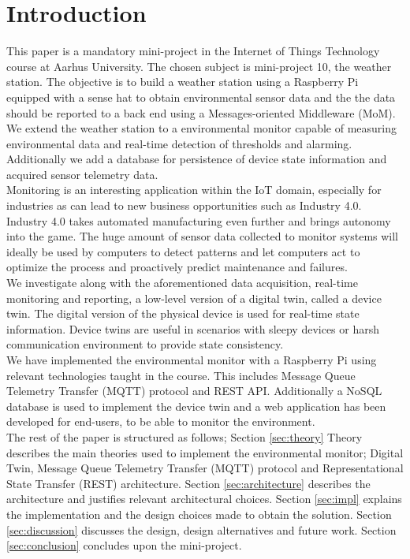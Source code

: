 \section{Introduction}
This paper is a mandatory mini-project in the Internet of Things Technology course at Aarhus University. The chosen subject is mini-project 10, the weather station. The objective is to build a weather station using a Raspberry Pi equipped with a sense hat to obtain environmental sensor data and the the data should be reported to a back end using a Messages-oriented Middleware (MoM). We extend the weather station to a environmental monitor capable of measuring environmental data and real-time detection of thresholds and alarming. Additionally we add a database for persistence of device state information and acquired sensor telemetry data. \\

Monitoring is an interesting application within the IoT domain, especially for industries as can lead to new business opportunities such as Industry 4.0. Industry 4.0 takes automated manufacturing even further and brings autonomy into the game. The huge amount of sensor data collected to monitor systems will ideally be used by computers to detect patterns and let computers act to optimize the process and proactively predict maintenance and failures. \\

We investigate along with the aforementioned data acquisition, real-time monitoring and reporting, a low-level version of a digital twin, called a device twin. The digital version of the physical device is used for real-time state information. Device twins are useful in scenarios with sleepy devices or harsh communication environment to provide state consistency. \\

We have implemented the environmental monitor with a Raspberry Pi using relevant technologies taught in the course. This includes Message Queue Telemetry Transfer (MQTT) protocol and REST API. Additionally a NoSQL database is used to implement the device twin and a web application has been developed for end-users, to be able to monitor the environment. \\

The rest of the paper is structured as follows; Section \ref{sec:theory} Theory describes the main theories used to implement the environmental monitor; Digital Twin, Message Queue Telemetry Transfer (MQTT) protocol and Representational State Transfer (REST) architecture. Section \ref{sec:architecture} describes the architecture and justifies relevant architectural choices. Section \ref{sec:impl} explains the implementation and the design choices made to obtain the solution. Section \ref{sec:discussion} discusses the design, design alternatives and future work. Section \ref{sec:conclusion} concludes upon the mini-project.

